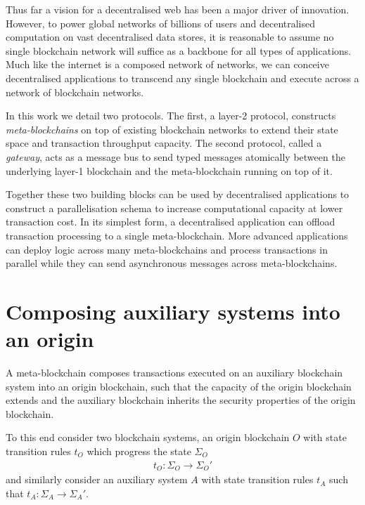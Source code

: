 \documentclass[12pt,a4paper]{article}
\begin{document}

Thus far a vision for a decentralised web has been a major driver of innovation.
However, to power global networks of billions of users and decentralised computation on vast decentralised data stores, it is reasonable to assume no single blockchain network will suffice as a backbone for all types of applications.
Much like the internet is a composed network of networks, we can conceive decentralised applications to transcend any single blockchain and execute across a network of blockchain networks.

In this work we detail two protocols.
The first, a layer-2 protocol, constructs \emph{meta-blockchains} on top of existing blockchain networks to extend their state space and transaction throughput capacity.
The second protocol, called a \emph{gateway}, acts as a message bus to send typed messages atomically between the underlying layer-1 blockchain and the meta-blockchain running on top of it.

Together these two building blocks can be used by decentralised applications to construct a parallelisation schema to increase %
computational capacity at lower transaction cost.
In its simplest form, a decentralised application can offload transaction processing to a single meta-blockchain.
More advanced applications can deploy logic across many meta-blockchains and process transactions in parallel while they can send asynchronous messages across meta-blockchains.



\section{Composing auxiliary systems into an origin}

A meta-blockchain composes transactions executed on an auxiliary blockchain system into an origin blockchain, such that the capacity of the origin blockchain extends and the auxiliary blockchain inherits the security properties of the origin blockchain.

To this end consider two blockchain systems, an origin blockchain $O$ with state transition rules $t_O$ which progress the state $\Sigma_O$ 
\begin{align} \label{state_transition_rules}
  t_O : \Sigma_O \rightarrow \Sigma_O'
\end{align}
and similarly consider an auxiliary system $A$ with state transition rules $t_A$ such that $t_A : \Sigma_A \rightarrow \Sigma_A'$.
\end{document}
